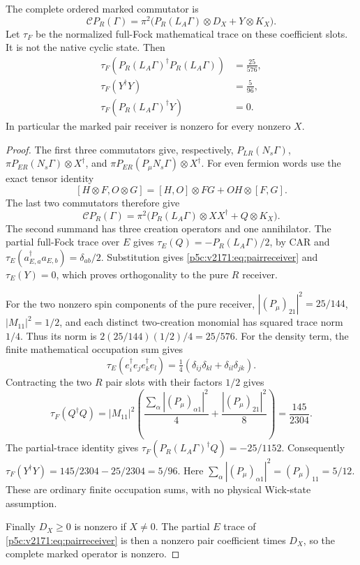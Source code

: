 \documentclass[12pt,a4paper]{article}
\begin{document}
\begin{theorem}
\label{p5c:v2171:thm:pairreceiver}
The complete ordered marked commutator is
\begin{equation}
 \boxed{\mathcal C P_R(\Gamma)
  =\pi^2\bigl(P_R(L_A\Gamma)\otimes D_X+Y\otimes K_X\bigr).}
 \label{p5c:v2171:eq:pairreceiver}
\end{equation}
Let $\tau_F$ be the normalized full-Fock mathematical trace on these
coefficient slots. It is not the native cyclic state. Then
\begin{equation}
 \boxed{\begin{aligned}
 \tau_F(P_R(L_A\Gamma)^\dagger P_R(L_A\Gamma))&=\frac{25}{576},\\
 \tau_F(Y^\dagger Y)&=\frac5{96},\\
 \tau_F(P_R(L_A\Gamma)^\dagger Y)&=0.
 \end{aligned}}
 \label{p5c:v2171:eq:pairreceivergram}
\end{equation}
In particular the marked pair receiver is nonzero for every nonzero $X$.
\end{theorem}
\begin{proof}
The first three commutators give, respectively,
$P_{LR}(N_s\Gamma)$,
$\pi P_{ER}(N_s\Gamma)\otimes X^\dagger$, and
$\pi P_{ER}(P_\mu N_s\Gamma)\otimes X^\dagger$.
For even fermion words use the exact tensor identity
\[
 [H\otimes F,O\otimes G]=[H,O]\otimes FG+OH\otimes[F,G].
\]
The last two commutators therefore give
\[
 \mathcal C P_R(\Gamma)=\pi^2\bigl(
 P_R(L_A\Gamma)\otimes XX^\dagger+Q\otimes K_X\bigr).
\]
The second summand has three creation operators and one annihilator.
The partial full-Fock trace over $E$ gives
$\tau_E(Q)=-P_R(L_A\Gamma)/2$, by CAR and
$\tau_E(a_{E,a}^\dagger a_{E,b})=\delta_{ab}/2$.
Substitution gives \eqref{p5c:v2171:eq:pairreceiver} and $\tau_E(Y)=0$,
which proves orthogonality to the pure $R$ receiver.

For the two nonzero spin components of the pure receiver,
$|(P_\mu)_{21}|^2=25/144$, $|M_{11}|^2=1/2$, and each distinct
two-creation monomial has squared trace norm $1/4$. Thus its norm is
$2(25/144)(1/2)/4=25/576$. For the density term, the finite mathematical
occupation sum gives
\[
 \tau_E(e_i^\dagger e_j e_k^\dagger e_l)
 =\tfrac14(\delta_{ij}\delta_{kl}+\delta_{il}\delta_{jk}).
\]
Contracting the two $R$ pair slots with their factors $1/2$ gives
\[
 \tau_F(Q^\dagger Q)=|M_{11}|^2\left(
 \frac{\sum_\alpha|(P_\mu)_{\alpha1}|^2}{4}
 +\frac{|(P_\mu)_{21}|^2}{8}\right)=\frac{145}{2304}.
\]
The partial-trace identity gives
$\tau_F(P_R(L_A\Gamma)^\dagger Q)=-25/1152$.
Consequently $\tau_F(Y^\dagger Y)=145/2304-25/2304=5/96$.
Here $\sum_\alpha|(P_\mu)_{\alpha1}|^2=(P_\mu)_{11}=5/12$.
These are ordinary finite occupation sums, with no physical Wick-state
assumption.

Finally $D_X\ge0$ is nonzero if $X\ne0$. The partial $E$ trace of
\eqref{p5c:v2171:eq:pairreceiver} is then a nonzero pair coefficient times $D_X$,
so the complete marked operator is nonzero.
\end{proof}
\end{document}
